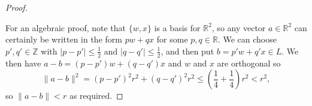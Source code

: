 \documentclass{amsart}
\newcommand{\Z}         {{\mathbb{Z}}}
\newcommand{\R}         {{\mathbb{R}}}
\newcommand{\half}      {{\textstyle\frac{1}{2}}}
\newcommand{\quarter}   {{\textstyle\frac{1}{4}}}
\newcommand{\blob}      {circle(0.03cm)}
\renewcommand{\:}{\colon}
\theoremstyle{definition}
\begin{document}
\begin{proof}
\begin{center}
 \end{center}
 For an algebraic proof, note that $\{w,x\}$ is a basis for $\R^2$, so
 any vector $a\in\R^2$ can certainly be written in the form $pw+qx$
 for some $p,q\in\R$.  We can choose $p',q'\in\Z$ with
 $|p-p'|\leq\half$ and $|q-q'|\leq\half$, and then put
 $b=p'w+q'x\in L$.  We then have $a-b=(p-p')w+(q-q')x$ and $w$ and $x$
 are orthogonal so
 \[ \|a-b\|^2=(p-p')^2r^2+(q-q')^2r^2\leq(\quarter+\quarter)r^2<r^2,
 \]
 so $\|a-b\|<r$ as required.


\end{proof}
\end{document}
